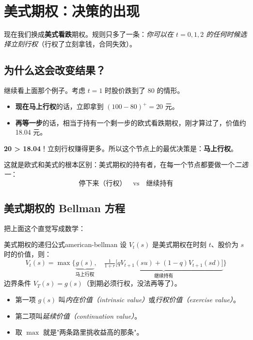 \documentclass[11pt,a4paper]{ctexart}
\newcommand{\1}{\mathbf{1}}
\begin{document}
\section{美式期权：决策的出现}\label{sec:american}

现在我们换成\textbf{美式看跌}期权。规则只多了一条：\emph{你可以在 $t=0, 1, 2$ 的任何时候选择立刻行权}（行权了立刻拿钱，合同失效）。

\subsection{为什么这会改变结果？}

继续看上面那个例子。考虑 $t=1$ 时股价跌到了 80 的情形。

\begin{itemize}[leftmargin=*]
    \item \textbf{现在马上行权}的话，立即拿到 $(100 - 80)^+ = 20$ 元。
    \item \textbf{再等一步}的话，相当于持有一个剩一步的欧式看跌期权，刚才算过了，价值约 18.04 元。
\end{itemize}

\textbf{20 > 18.04}！立刻行权赚得更多。所以这个节点上的最优决策是：\textbf{马上行权}。

这就是欧式和美式的根本区别：美式期权的持有者，在每一个节点都要做一个\emph{二选一}：
\[
\boxed{\text{停下来（行权）} \quad \text{vs} \quad \text{继续持有}}
\]

\subsection{美式期权的 Bellman 方程}

把上面这个直觉写成数学：

\begin{idea}{美式期权的递归公式}{american-bellman}
设 $V_t(s)$ 是美式期权在时刻 $t$、股价为 $s$ 时的价值，则：
\[
\boxed{
V_t(s) = \max\Big\{\underbrace{g(s)}_{\text{马上行权}}, \quad \underbrace{\tfrac{1}{1+r}\bigl[q V_{t+1}(su) + (1-q) V_{t+1}(sd)\bigr]}_{\text{继续持有}}\Big\}
}
\]
边界条件 $V_T(s) = g(s)$（到期必须行权，没法再等了）。
\end{idea}

\begin{itemize}[leftmargin=*]
    \item 第一项 $g(s)$ 叫\emph{内在价值（intrinsic value）}或\emph{行权价值（exercise value）}。
    \item 第二项叫\emph{延续价值（continuation value）}。
    \item 取 $\max$ 就是"两条路里挑收益高的那条"。
\end{itemize}
\end{document}
